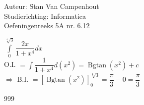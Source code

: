 \documentclass[a4paper]{article}
\begin{document}
  
\noindent \large Auteur: Stan Van Campenhout \\
\noindent \large Studierichting:  Informatica\\
\noindent \large Oefeningenreeks 5A nr. 6.12\\

\medskip

\normalsize

$ \displaystyle\int\limits_0^{\sqrt[4]{3}}\dfrac{2x}{1+x^4} dx $\\

O.I. $ = \displaystyle\int\dfrac{1}{1+x^4}d\left(x^2\right) = \operatorname{Bgtan}\left(x^2\right) + c $\\

$ \Rightarrow $ B.I. $ = \left[\operatorname{Bgtan}\left(x^2\right)\right]_0^{\sqrt[4]{3}} = \dfrac{\pi}{3} - 0 = \dfrac{\pi}{3} $\\

\begin{thebibliography}{999}
\end{thebibliography}
\end{document}
